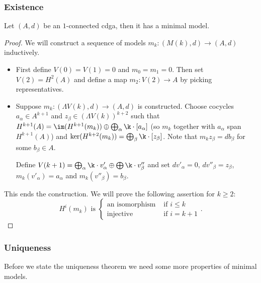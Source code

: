 \subsubsection{Existence}

\begin{theorem}
	Let $(A, d)$ be an $1$-connected cdga, then it has a minimal model.
\end{theorem}
\begin{proof}
	We will construct a sequence of models $m_k: (M(k), d) \to (A, d)$ inductively.
	\begin{itemize}
		\item First define $V(0) = V(1) = 0$ and $m_0 = m_1 = 0$. Then set $V(2) = H^2(A)$ and define a map $m_2: V(2) \to A$ by picking representatives.
		\item Suppose $m_k: (\Lambda V(k), d) \to (A, d)$ is constructed. Choose cocycles $a_\alpha \in A^{k+1}$ and $z_\beta \in (\Lambda V(k))^{k+2}$ such that $H^{k+1}(A) = \im(H^{k+1}(m_k)) \oplus \bigoplus_\alpha \k \cdot [a_\alpha]$ (so $m_k$ together with $a_\alpha$ span $H^{k+1}(A)$) and $\ker(H^{k+2}(m_k)) = \bigoplus_\beta \k \cdot [z_\beta]$. Note that $m_k z_\beta = db_\beta$ for some $b_\beta \in A$.

		Define $V(k+1) = \bigoplus_\alpha \k \cdot v'_\alpha \oplus \bigoplus \k \cdot v''_\beta$ and set $dv'_\alpha = 0$, $dv''_\beta = z_\beta$, $m_k(v'_\alpha) = a_\alpha$ and $m_k(v''_\beta) = b_\beta$.
	\end{itemize}
	This ends the construction. We will prove the following assertion for $k \geq 2$:
	$$ H^i(m_k) \text{ is } \begin{cases}
		\text{an isomorphism} &\text{ if } i \leq k \\
		\text{injective}      &\text{ if } i = k + 1
	\end{cases}. $$
\end{proof}


\subsubsection{Uniqueness}

Before we state the uniqueness theorem we need some more properties of minimal models.

